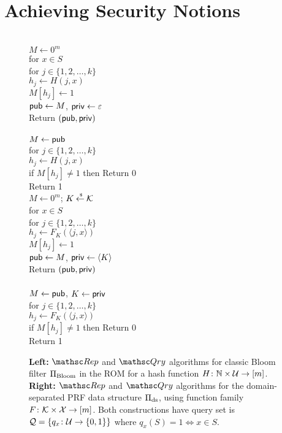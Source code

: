 \section{Achieving Security Notions}



\begin{figure}[tp]
\centering
{}
{
\\
$M \gets 0^m$\\
for $x \in S$\\
\nudge for $j \in \{1,2,\ldots,k\}$\\
\nudge\nudge $h_j \gets H(j,x)$\\
\nudge\nudge $M[h_j] \gets 1$\\
${\sf pub} \gets M$, ${\sf priv} \gets \varepsilon$\\
Return $({\sf pub},{\sf priv})$\\

\medskip
{}\\
$M\gets{\sf pub}$\\
for $j \in \{1,2,\ldots,k\}$\\
\nudge $h_j \gets H(j,x)$\\
\nudge if $M[h_j] \neq 1$ then Return 0\\
Return 1
}
{
\\
$M \gets 0^m$; $K {\:\stackrel{{\scriptscriptstyle \hspace{0.2em}\$}} {\leftarrow}\:} {\cal K}$\\
for $x \in S$\\
\nudge for $j \in \{1,2,\ldots,k\}$\\
\nudge\nudge $h_j \gets F_{K}(\langle j,x \rangle) $\\
\nudge\nudge $M[h_j] \gets 1$\\
${\sf pub} \gets M$, ${\sf priv} \gets \langle K \rangle$\\
Return $({\sf pub},{\sf priv})$\\

\medskip
{}\\
$M\gets{\sf pub}$, $K \gets {\sf priv}$\\
for $j \in \{1,2,\ldots,k\}$\\
\nudge $h_j \gets F_{K}(\langle j,x \rangle) $\\
\nudge if $M[h_j] \neq 1$ then Return 0\\
Return 1
}
\caption{{\bf Left:} $\Rep$ and $\Qry$ algorithms for classic Bloom
  filter $\Pi_{\mathrm{Bloom}}$ in the ROM for a hash function $H\colon \mathbb{N} \times
  {\cal U} \to [m]$. {\bf Right:} $\Rep$ and $\Qry$
  algorithms for the domain-separated PRF data structure
  $\Pi_{\mathrm{ds}}$, using function family $F \colon
  {\cal K} \times {\cal X} \to [m]$.  Both constructions have query set is ${\cal Q}=\{q_x\colon
  {\cal U} \to \{0,1\}\}$ where $q_x(S)=1 \Leftrightarrow x \in S$.  }
\label{fig:bf-and-lin}
\end{figure}

